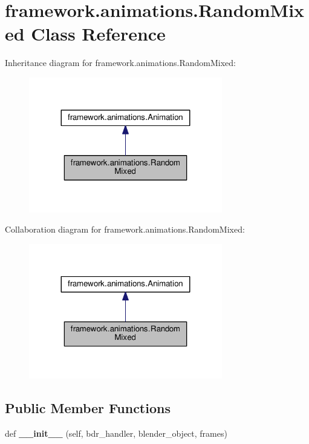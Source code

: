 \hypertarget{classframework_1_1animations_1_1RandomMixed}{}\section{framework.\+animations.\+Random\+Mixed Class Reference}
\label{classframework_1_1animations_1_1RandomMixed}


Inheritance diagram for framework.\+animations.\+Random\+Mixed\+:
\nopagebreak
\begin{figure}[H]
\begin{center}
\leavevmode
\includegraphics[width=239pt]{classframework_1_1animations_1_1RandomMixed__inherit__graph}
\end{center}
\end{figure}


Collaboration diagram for framework.\+animations.\+Random\+Mixed\+:
\nopagebreak
\begin{figure}[H]
\begin{center}
\leavevmode
\includegraphics[width=239pt]{classframework_1_1animations_1_1RandomMixed__coll__graph}
\end{center}
\end{figure}
\subsection*{Public Member Functions}
\begin{DoxyCompactItemize}
\item 
def {\bfseries \+\_\+\+\_\+init\+\_\+\+\_\+} (self, bdr\+\_\+handler, blender\+\_\+object, frames)\hypertarget{classframework_1_1animations_1_1RandomMixed_aca5bef51a8fa5a084208e58a45565cbd}{}\label{classframework_1_1animations_1_1RandomMixed_aca5bef51a8fa5a084208e58a45565cbd}

\end{DoxyCompactItemize}
